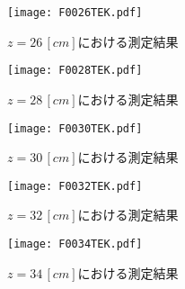 \begin{figure}[H]
    \centering
    \texttt{[image: F0026TEK.pdf]}
    \caption{$z=26\,[cm]$における測定結果}
\end{figure}

\begin{figure}[H]
    \centering
    \texttt{[image: F0028TEK.pdf]}
    \caption{$z=28\,[cm]$における測定結果}
\end{figure}

\begin{figure}[H]
    \centering
    \texttt{[image: F0030TEK.pdf]}
    \caption{$z=30\,[cm]$における測定結果}
\end{figure}

\begin{figure}[H]
    \centering
    \texttt{[image: F0032TEK.pdf]}
    \caption{$z=32\,[cm]$における測定結果}
\end{figure}

\begin{figure}[H]
    \centering
    \texttt{[image: F0034TEK.pdf]}
    \caption{$z=34\,[cm]$における測定結果}
\end{figure}